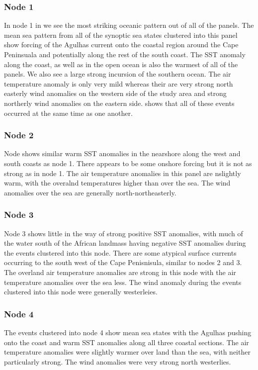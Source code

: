 \documentclass[a4paper,10pt,review]{elsarticle}
\begin{document}
\subsubsection{Node 1}
In node 1 in  we see the most striking oceanic pattern out of all of the panels. The mean sea pattern from all of the synoptic sea states clustered into this panel show forcing of the Agulhas current onto the coastal region around the Cape Peninsuala and potentially along the rest of the south coast. The SST anomaly along the coast, as well as in the open ocean is also the warmest of all of the panels. We also see a large strong incursion of the southern ocean. The air temperature anomaly is only very mild whereas their are very strong north easterly wind anomalies on the western side of the study area and strong northerly wind anomalies on the eastern side.  shows that all of these events occurred at the same time as one another.

\subsubsection{Node 2}
Node shows similar warm SST anomalies in the nearshore along the west and south coasts as node 1. There appears to be some onshore forcing but it is not as strong as in node 1. The air temperature anomalies in this panel are nslightly warm, with the overalnd temperatures higher than over the sea. The wind anomalies over the sea are generally north-northeasterly.


\subsubsection{Node 3}
Node 3 shows little in the way of strong positive SST anomalies, with much of the water south of the African landmass having negative SST anomalies during the events clustered into this node. There are some atypical surface currents occurring to the south west of the Cape Penisnisula, similar to nodes 2 and 3. The overland air temperature anomalies are strong in this node with the air temperature anomalies over the sea less. The wind anomaly during the events clustered into this node were generally westerleies.

\subsubsection{Node 4}
The events clustered into node 4 show mean sea states with the Agulhas pushing onto the coast and warm SST anomalies along all three coastal sections. The air temperature anomalies were slightly warmer over land than the sea, with neither particularly strong. The wind anomalies were very strong north westerlies.
\end{document}
